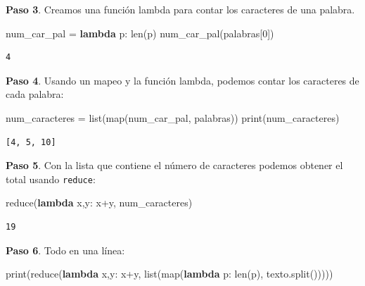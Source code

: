 \documentclass[
  spanish,
  letterpaper,
]{scrbook}
\newenvironment{Shaded}{\begin{snugshade}}{\end{snugshade}}
\newcommand{\BuiltInTok}[1]{\textcolor[rgb]{0.00,0.23,0.31}{#1}}
\newcommand{\DecValTok}[1]{\textcolor[rgb]{0.68,0.00,0.00}{#1}}
\newcommand{\KeywordTok}[1]{\textcolor[rgb]{0.00,0.23,0.31}{\textbf{#1}}}
\newcommand{\NormalTok}[1]{\textcolor[rgb]{0.00,0.23,0.31}{#1}}
\newcommand{\OperatorTok}[1]{\textcolor[rgb]{0.37,0.37,0.37}{#1}}
\theoremstyle{definition}
\theoremstyle{remark}
\begin{document}
\textbf{Paso 3}. Creamos una función lambda para contar los caracteres
de una palabra.

\begin{Shaded}
\begin{Highlighting}[]
\NormalTok{num\_car\_pal }\OperatorTok{=} \KeywordTok{lambda}\NormalTok{ p: }\BuiltInTok{len}\NormalTok{(p)}
\NormalTok{num\_car\_pal(palabras[}\DecValTok{0}\NormalTok{])}
\end{Highlighting}
\end{Shaded}

\begin{verbatim}
4
\end{verbatim}

\textbf{Paso 4}. Usando un mapeo y la función lambda, podemos contar los
caracteres de cada palabra:

\begin{Shaded}
\begin{Highlighting}[]
\NormalTok{num\_caracteres }\OperatorTok{=} \BuiltInTok{list}\NormalTok{(}\BuiltInTok{map}\NormalTok{(num\_car\_pal, palabras))}
\BuiltInTok{print}\NormalTok{(num\_caracteres)}
\end{Highlighting}
\end{Shaded}

\begin{verbatim}
[4, 5, 10]
\end{verbatim}

\textbf{Paso 5}. Con la lista que contiene el número de caracteres
podemos obtener el total usando \texttt{reduce}:

\begin{Shaded}
\begin{Highlighting}[]
\BuiltInTok{reduce}\NormalTok{(}\KeywordTok{lambda}\NormalTok{ x,y: x}\OperatorTok{+}\NormalTok{y, num\_caracteres)}
\end{Highlighting}
\end{Shaded}

\begin{verbatim}
19
\end{verbatim}

\textbf{Paso 6}. Todo en una línea:

\begin{Shaded}
\begin{Highlighting}[]
\BuiltInTok{print}\NormalTok{(}\BuiltInTok{reduce}\NormalTok{(}\KeywordTok{lambda}\NormalTok{ x,y: x}\OperatorTok{+}\NormalTok{y, }\BuiltInTok{list}\NormalTok{(}\BuiltInTok{map}\NormalTok{(}\KeywordTok{lambda}\NormalTok{ p: }\BuiltInTok{len}\NormalTok{(p), texto.split()))))}
\end{Highlighting}
\end{Shaded}
\end{document}
